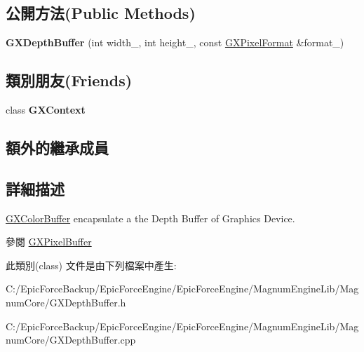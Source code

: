 \subsection*{公開方法(Public Methods)}
\begin{DoxyCompactItemize}
\item 
{\bfseries G\+X\+Depth\+Buffer} (int width\+\_\+, int height\+\_\+, const \hyperlink{class_magnum_1_1_g_x_pixel_format}{G\+X\+Pixel\+Format} \&format\+\_\+)\hypertarget{class_magnum_1_1_g_x_depth_buffer_acbd2237406bb10a696d1759f8bcaf494}{}\label{class_magnum_1_1_g_x_depth_buffer_acbd2237406bb10a696d1759f8bcaf494}

\end{DoxyCompactItemize}
\subsection*{類別朋友(Friends)}
\begin{DoxyCompactItemize}
\item 
class {\bfseries G\+X\+Context}\hypertarget{class_magnum_1_1_g_x_depth_buffer_a2c36d7f8865080802bbad88cd73d871c}{}\label{class_magnum_1_1_g_x_depth_buffer_a2c36d7f8865080802bbad88cd73d871c}

\end{DoxyCompactItemize}
\subsection*{額外的繼承成員}


\subsection{詳細描述}
\hyperlink{class_magnum_1_1_g_x_color_buffer}{G\+X\+Color\+Buffer} encapsulate a the Depth Buffer of Graphics Device. 

\begin{DoxySeeAlso}{參閱}
\hyperlink{class_magnum_1_1_g_x_pixel_buffer}{G\+X\+Pixel\+Buffer} 
\end{DoxySeeAlso}


此類別(class) 文件是由下列檔案中產生\+:\begin{DoxyCompactItemize}
\item 
C\+:/\+Epic\+Force\+Backup/\+Epic\+Force\+Engine/\+Epic\+Force\+Engine/\+Magnum\+Engine\+Lib/\+Magnum\+Core/G\+X\+Depth\+Buffer.\+h\item 
C\+:/\+Epic\+Force\+Backup/\+Epic\+Force\+Engine/\+Epic\+Force\+Engine/\+Magnum\+Engine\+Lib/\+Magnum\+Core/G\+X\+Depth\+Buffer.\+cpp\end{DoxyCompactItemize}
